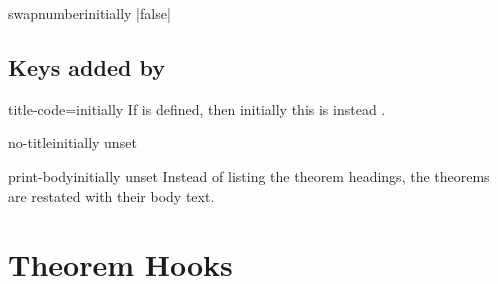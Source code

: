 \documentclass{ltxdoc}
\newcommand{\ttbrackets}[1]{\brackets{\texttt{#1}}}
\begin{document}
\begin{docKey}{swapnumber}{}{initially |false|}

\end{docKey}

\subsection{Keys added by }

\begin{docKey}{title-code}{=}{initially \ttbrackets{\#1}}
If  is defined, then initially this is instead \ttbrackets{\#1}.
\end{docKey}

\begin{docKey}{no-title}{}{initially unset}

\end{docKey}

\begin{docKey}{print-body}{}{initially unset}
Instead of listing the theorem headings, the theorems are restated with their body text.
\end{docKey}

\section{Theorem Hooks} \label{thmkeys-hooks}
\end{document}
